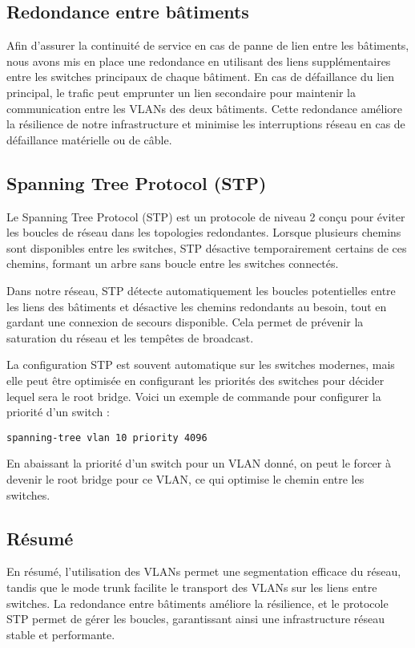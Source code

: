 \documentclass[a4paper,12pt]{report}
\begin{document}
\begin{itemize}
            \subsection{Redondance entre bâtiments}
                Afin d'assurer la continuité de service en cas de panne de lien entre les bâtiments, nous avons mis en place une redondance en utilisant des liens supplémentaires entre les switches principaux de chaque bâtiment. En cas de défaillance du lien principal, le trafic peut emprunter un lien secondaire pour maintenir la communication entre les VLANs des deux bâtiments. Cette redondance améliore la résilience de notre infrastructure et minimise les interruptions réseau en cas de défaillance matérielle ou de câble.

            \subsection{Spanning Tree Protocol (STP)}
                Le Spanning Tree Protocol (STP) est un protocole de niveau 2 conçu pour éviter les boucles de réseau dans les topologies redondantes. Lorsque plusieurs chemins sont disponibles entre les switches, STP désactive temporairement certains de ces chemins, formant un arbre sans boucle entre les switches connectés. 

                Dans notre réseau, STP détecte automatiquement les boucles potentielles entre les liens des bâtiments et désactive les chemins redondants au besoin, tout en gardant une connexion de secours disponible. Cela permet de prévenir la saturation du réseau et les tempêtes de broadcast.

                La configuration STP est souvent automatique sur les switches modernes, mais elle peut être optimisée en configurant les priorités des switches pour décider lequel sera le root bridge. Voici un exemple de commande pour configurer la priorité d'un switch :

                \begin{verbatim}
spanning-tree vlan 10 priority 4096
                \end{verbatim}

                En abaissant la priorité d'un switch pour un VLAN donné, on peut le forcer à devenir le root bridge pour ce VLAN, ce qui optimise le chemin entre les switches.

            \subsection{Résumé}
                En résumé, l'utilisation des VLANs permet une segmentation efficace du réseau, tandis que le mode trunk facilite le transport des VLANs sur les liens entre switches. La redondance entre bâtiments améliore la résilience, et le protocole STP permet de gérer les boucles, garantissant ainsi une infrastructure réseau stable et performante.



\end{itemize}
\end{document}
